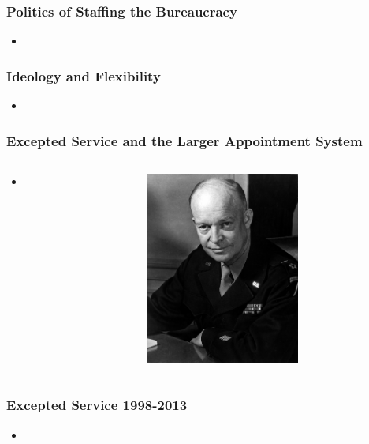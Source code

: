 \documentclass{beamer}
\begin{document}
\begin{frame}
\frametitle{Politics of Staffing the Bureaucracy}
\begin{itemize}\addtolength{\itemsep}{1.5\baselineskip}
\item 
\end{itemize}
\hfill%
\end{frame}

\begin{frame}
\frametitle{Ideology and Flexibility}
\begin{itemize}\addtolength{\itemsep}{1.5\baselineskip}
\item
\end{itemize}
\hfill%
\end{frame}

\begin{frame}
\frametitle{Excepted Service and the Larger Appointment System}
\begin{columns}[T] %
\begin{column}{.48\textwidth}
\begin{itemize}\addtolength{\itemsep}{1.5\baselineskip}
\item
\end{itemize}
\end{column}%
\hfill%
\begin{column}{.48\textwidth}
\includegraphics[height=2.5in,width=2in]{eisenhower.jpg}
\end{column}%
\end{columns}
\end{frame}

\begin{frame}
\frametitle{Excepted Service 1998-2013}
\begin{itemize}\addtolength{\itemsep}{1.5\baselineskip}
\item
\end{itemize}
\hfill%
\end{frame}
\end{document}
